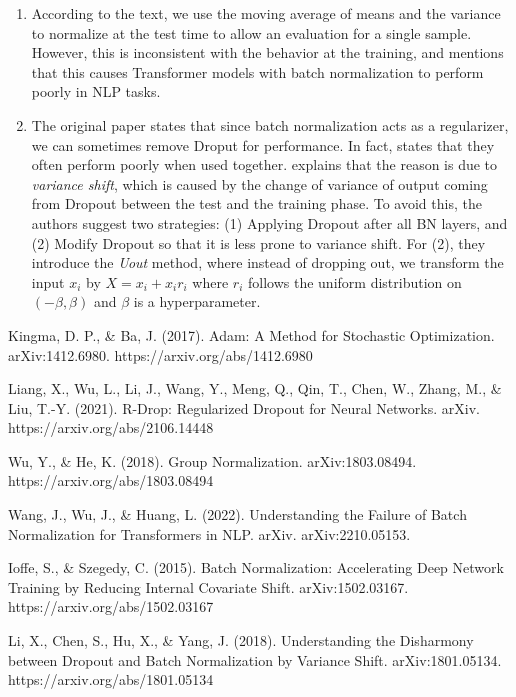 \documentclass[
	12pt, %
]{../Template/fphw}
\begin{document}
\begin{enumerate}[label = (\arabic*)]
    \item According to the text, we use the moving average of means and the variance to normalize at the test time to allow an evaluation for a single sample. However, this is inconsistent with the behavior at the training, and \cite{failurebn} mentions that this causes Transformer models with batch normalization to perform poorly in NLP tasks.

    \item The original paper \cite{batchnorm} states that since batch normalization acts as a regularizer, we can sometimes remove Droput for performance. In fact, \cite{doandbn} states that they often perform poorly when used together. \cite{doandbn} explains that the reason is due to \textit{variance shift}, which is caused by the change of variance of output coming from Dropout between the test and the training phase. To avoid this, the authors suggest two strategies: (1) Applying Dropout after all BN layers, and (2) Modify Dropout so that it is less prone to variance shift. For (2), they introduce the \textit{Uout} method, where instead of dropping out, we transform the input $x_i$ by $X=x_i+x_i r_i$ where $r_i$ follows the uniform distribution on $(-\beta, \beta)$ and $\beta$ is a hyperparameter. 
\end{enumerate}


\begin{thebibliography}{9}
Kingma, D. P., \& Ba, J. (2017). Adam: A Method for Stochastic Optimization. arXiv:1412.6980. https://arxiv.org/abs/1412.6980

Liang, X., Wu, L., Li, J., Wang, Y., Meng, Q., Qin, T., Chen, W., Zhang, M., \& Liu, T.-Y. (2021). R-Drop: Regularized Dropout for Neural Networks. arXiv. https://arxiv.org/abs/2106.14448

 Wu, Y., \& He, K. (2018). Group Normalization. arXiv:1803.08494. https://arxiv.org/abs/1803.08494

 Wang, J., Wu, J., \& Huang, L. (2022). Understanding the Failure of Batch Normalization for Transformers in NLP. arXiv. arXiv:2210.05153.

Ioffe, S., \& Szegedy, C. (2015). Batch Normalization: Accelerating Deep Network Training by Reducing Internal Covariate Shift. arXiv:1502.03167. https://arxiv.org/abs/1502.03167

Li, X., Chen, S., Hu, X., \& Yang, J. (2018). Understanding the Disharmony between Dropout and Batch Normalization by Variance Shift. arXiv:1801.05134. https://arxiv.org/abs/1801.05134



\end{thebibliography}
\end{document}
